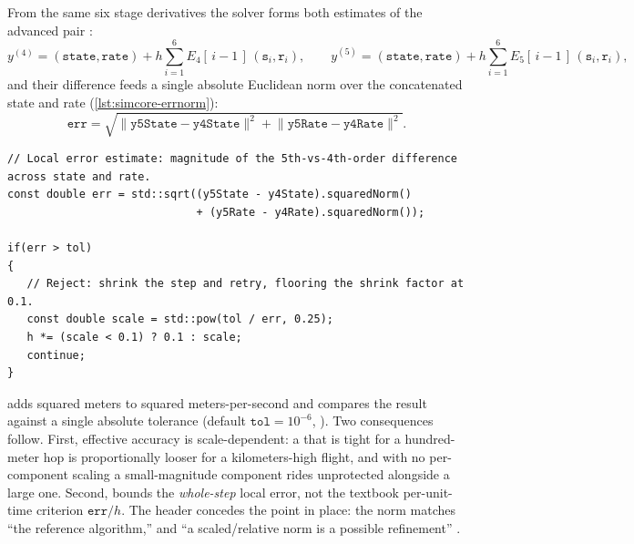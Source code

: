 From the same six stage derivatives the solver forms both estimates of the advanced pair
:
\begin{equation}\label{eq:simcore-estimates}
y^{(4)} = (\mathtt{state},\mathtt{rate}) + h\sum_{i=1}^{6} E_4[\,i{-}1\,]\,(\mathtt{s}_i,\mathtt{r}_i),
\qquad
y^{(5)} = (\mathtt{state},\mathtt{rate}) + h\sum_{i=1}^{6} E_5[\,i{-}1\,]\,(\mathtt{s}_i,\mathtt{r}_i),
\end{equation}
and their difference feeds a single absolute Euclidean norm over the concatenated state and rate
(\cref{lst:simcore-errnorm}):
\begin{equation}\label{eq:simcore-errnorm}
\mathtt{err} = \sqrt{\bigl\lVert \mathtt{y5State}-\mathtt{y4State} \bigr\rVert^{2}
                   + \bigl\lVert \mathtt{y5Rate}-\mathtt{y4Rate} \bigr\rVert^{2}} .
\end{equation}

\begin{listing}[htbp]
\begin{verbatim}
// Local error estimate: magnitude of the 5th-vs-4th-order difference across state and rate.
const double err = std::sqrt((y5State - y4State).squaredNorm()
                             + (y5Rate - y4Rate).squaredNorm());

if(err > tol)
{
   // Reject: shrink the step and retry, flooring the shrink factor at 0.1.
   const double scale = std::pow(tol / err, 0.25);
   h *= (scale < 0.1) ? 0.1 : scale;
   continue;
}
\end{verbatim}
\caption{The embedded pair's error estimate and rejection branch
: one absolute norm across position and velocity, compared
directly against , with the shrink factor floored at $0.1$.}
\label{lst:simcore-errnorm}
\end{listing}

\begin{keyinsight}
 adds squared meters to squared meters-per-second and compares the
result against a single absolute tolerance (default $\mathtt{tol}=10^{-6}$,
). Two consequences follow. First, effective accuracy is
scale-dependent: a  that is tight for a hundred-meter hop is proportionally looser for
a kilometers-high flight, and with no per-component scaling a small-magnitude component rides
unprotected alongside a large one. Second,  bounds the \emph{whole-step} local error,
not the textbook per-unit-time criterion $\mathtt{err}/h$. The header concedes the point in
place: the norm matches ``the reference algorithm,'' and ``a scaled/relative norm is a possible
refinement'' .
\end{keyinsight}

